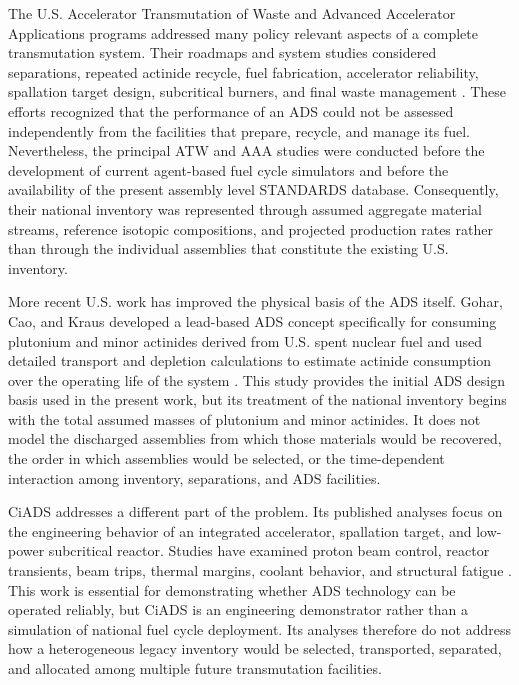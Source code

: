 The U.S. Accelerator Transmutation of Waste and Advanced Accelerator
Applications programs addressed many policy relevant aspects of a complete
transmutation system. Their roadmaps and system studies considered
separations, repeated actinide recycle, fuel fabrication, accelerator
reliability, spallation target design, subcritical burners, and final waste
management
\cite{vantuyleRoadmapDevelopingATW2001,
bellerUSAcceleratorTransmutation2001}.
These efforts recognized that the performance of an \gls{ADS} could not be assessed
independently from the facilities that prepare, recycle, and manage its fuel.
Nevertheless, the principal \gls{ATW} and \gls{AAA} studies were conducted before the
development of current agent-based fuel cycle simulators and before the
availability of the present assembly level \gls{STANDARDS} database. Consequently,
their national inventory was represented through assumed aggregate material
streams, reference isotopic compositions, and projected production rates
rather than through the individual assemblies that constitute the existing
U.S. inventory.

More recent U.S. work has improved the physical basis of the \gls{ADS} itself.
Gohar, Cao, and Kraus developed a lead-based \gls{ADS} concept specifically for
consuming plutonium and minor actinides derived from U.S. spent nuclear fuel
and used detailed transport and depletion calculations to estimate actinide
consumption over the operating life of the system
\cite{gohar_ads_2021}. This study provides the initial \gls{ADS} design basis used
in the present work, but its treatment of the national inventory begins with
the total assumed masses of plutonium and minor actinides. It does not model
the discharged assemblies from which those materials would be recovered, the
order in which assemblies would be selected, or the time-dependent
interaction among inventory, separations, and \gls{ADS} facilities.

CiADS addresses a different part of the problem. Its published analyses
focus on the engineering behavior of an integrated accelerator, spallation
target, and low-power subcritical reactor. Studies have examined proton beam
control, reactor transients, beam trips, thermal margins, coolant behavior,
and structural fatigue
\cite{wu_design_2016,yin_power_2022,wang_transient_2023,
wang_beam_trips_2024}. This work is essential for demonstrating whether \gls{ADS}
technology can be operated reliably, but CiADS is an engineering
demonstrator rather than a simulation of national fuel cycle deployment. Its
analyses therefore do not address how a heterogeneous legacy inventory would
be selected, transported, separated, and allocated among multiple future
transmutation facilities.

